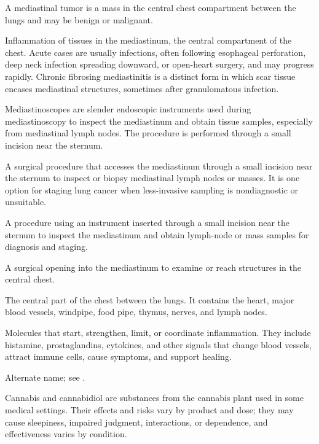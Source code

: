  A mediastinal tumor is a mass in the central chest compartment between the lungs and may be benign or malignant.

 Inflammation of tissues in the mediastinum, the central compartment of the chest. Acute cases are usually infections, often following esophageal perforation, deep neck infection spreading downward, or open-heart surgery, and may progress rapidly. Chronic fibrosing mediastinitis is a distinct form in which scar tissue encases mediastinal structures, sometimes after granulomatous infection.

 Mediastinoscopes are slender endoscopic instruments used during mediastinoscopy to inspect the mediastinum and obtain tissue samples, especially from mediastinal lymph nodes. The procedure is performed through a small incision near the sternum.

 A surgical procedure that accesses the mediastinum through a small incision near the sternum to
inspect or biopsy mediastinal lymph nodes or masses. It is one option for staging lung cancer
when less-invasive sampling is nondiagnostic or unsuitable.

 A procedure using an instrument inserted through a small incision near the sternum to inspect the mediastinum and obtain lymph-node or mass samples for diagnosis and staging.

 A surgical opening into the mediastinum to examine or reach structures in the central chest.

 The central part of the chest between the lungs. It contains the heart, major blood vessels, windpipe, food pipe, thymus, nerves, and lymph nodes.

 Molecules that start, strengthen, limit, or coordinate inflammation. They include histamine, prostaglandins, cytokines, and other signals that change blood vessels, attract immune cells, cause symptoms, and support healing.

 Alternate name; see .

 Cannabis and cannabidiol are substances from the cannabis plant used in some medical settings. Their effects and risks vary by product and dose; they may cause sleepiness, impaired judgment, interactions, or dependence, and effectiveness varies by condition.

